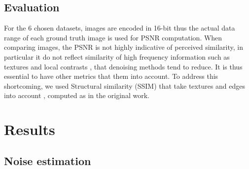 \documentclass{article}
\begin{document}
\subsection{Evaluation}
For the 6 chosen datasets, images are encoded in 16-bit thus the actual data range of each ground truth image is used for PSNR computation.
When comparing images, the PSNR is not highly indicative of perceived similarity, in particular it do not reflect similarity of high frequency information such as textures and local contrasts \cite{wang2004image}, that denoising methods tend to reduce. It is thus essential to have other metrics that them into account.
To address this shortcoming, we used Structural similarity (SSIM) that take textures and edges into account \cite{wang2004image}, computed as in the original work.

\section{Results}
\label{sec:results}
\subsection{Noise estimation}
\end{document}
